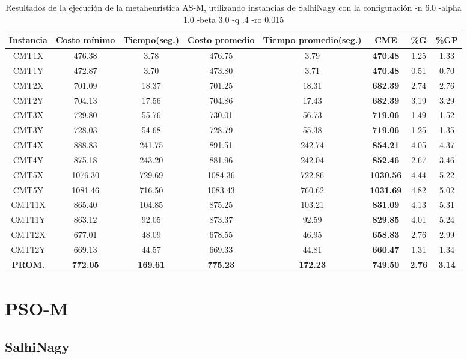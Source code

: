 \begin{table}[h]
\caption{Resultados de la ejecución de la metaheurística AS-M, utilizando instancias de SalhiNagy con la configuración -n 6.0 -alpha 1.0 -beta 3.0 -q .4 -ro 0.015}
\centering
\small
\begin{tabular}{c c c c c c c c}
\hline\hline
Instancia & Costo mínimo & Tiempo(seg.) & Costo promedio & Tiempo promedio(seg.) & CME & \%G & \%GP \\ [0.5ex]
\hline
CMT1X & 476.38 & 3.78 & 
476.75 & 3.79 & \bf{470.48} & 
1.25 & 1.33\\CMT1Y & 472.87 & 3.70 & 
473.80 & 3.71 & \bf{470.48} & 
0.51 & 0.70\\CMT2X & 701.09 & 18.37 & 
701.25 & 18.31 & \bf{682.39} & 
2.74 & 2.76\\CMT2Y & 704.13 & 17.56 & 
704.86 & 17.43 & \bf{682.39} & 
3.19 & 3.29\\CMT3X & 729.80 & 55.76 & 
730.01 & 56.73 & \bf{719.06} & 
1.49 & 1.52\\CMT3Y & 728.03 & 54.68 & 
728.79 & 55.38 & \bf{719.06} & 
1.25 & 1.35\\CMT4X & 888.83 & 241.75 & 
891.51 & 242.74 & \bf{854.21} & 
4.05 & 4.37\\CMT4Y & 875.18 & 243.20 & 
881.96 & 242.04 & \bf{852.46} & 
2.67 & 3.46\\CMT5X & 1076.30 & 729.69 & 
1084.36 & 722.86 & \bf{1030.56} & 
4.44 & 5.22\\CMT5Y & 1081.46 & 716.50 & 
1083.43 & 760.62 & \bf{1031.69} & 
4.82 & 5.02\\CMT11X & 865.40 & 104.85 & 
875.25 & 103.21 & \bf{831.09} & 
4.13 & 5.31\\CMT11Y & 863.12 & 92.05 & 
873.37 & 92.59 & \bf{829.85} & 
4.01 & 5.24\\CMT12X & 677.01 & 48.09 & 
678.55 & 46.95 & \bf{658.83} & 
2.76 & 2.99\\CMT12Y & 669.13 & 44.57 & 
669.33 & 44.81 & \bf{660.47} & 
1.31 & 1.34\\\bf{PROM.} & 
\bf{772.05} & \bf{169.61} & \bf{775.23} & \bf{172.23} & \bf{749.50} & \bf{2.76} & \bf{3.14}\\[1ex]\hline
\end{tabular}
\label{table:AS-M-salhinagy}
\end{table}
\clearpage
\section{PSO-M}\label{tablas-entonacion-PSO-M}
\subsection{SalhiNagy}\label{tablas-entonacion-PSO-M-salhinagy}


